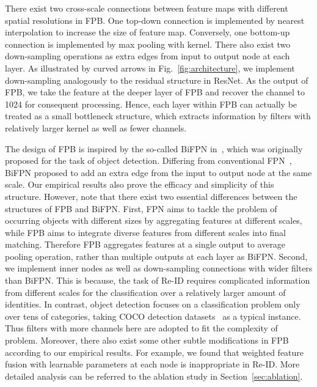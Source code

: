 \documentclass[journal]{IEEEtran}
\begin{document}
There exist two cross-scale connections between feature maps with different spatial resolutions in FPB.
One top-down connection is implemented by nearest interpolation to increase the size of feature map.
Conversely, one bottom-up connection is implemented by max pooling with  kernel.
There also exist two down-sampling operations as extra edges from input to output node at each layer.
As illustrated by curved arrows in Fig.~\ref{fig:architecture}, we implement down-sampling analogously to the residual structure in ResNet.
As the output of FPB, we take the feature at the deeper layer of FPB and recover the channel to 1024 for consequent processing.
Hence, each layer within FPB can actually be treated as a small bottleneck structure, which extracts information by filters with relatively larger kernel as well as fewer channels.

The design of FPB is inspired by the so-called BiFPN in~\cite{9156454}, which was originally proposed for the task of object detection.
Differing from conventional FPN~\cite{8099589,8579011}, BiFPN proposed to add an extra edge from the input to output node at the same scale.
Our empirical results also prove the efficacy and simplicity of this structure.
However, note that there exist two essential differences between the structures of FPB and BiFPN.
First, FPN aims to tackle the problem of occurring objects with different sizes by aggregating features at different scales, while FPB aims to integrate diverse features from different scales into final matching.
Therefore FPB aggregates features at a single output to average pooling operation, rather than multiple outputs at each layer as BiFPN.
Second, we implement inner nodes as well as down-sampling connections with wider filters than BiFPN.
This is because, the task of Re-ID requires complicated information from different scales for the classification over a relatively larger amount of identities.
In contrast, object detection focuses on a classification problem only over tens of categories, taking COCO detection datasets~\cite{978-3-319-10602-1_48} as a typical instance.
Thus filters with more channels here are adopted to fit the complexity of problem.
Moreover, there also exist some other subtle modifications in FPB according to our empirical results.
For example, we found that weighted feature fusion with learnable parameters at each node is inappropriate in Re-ID.
More detailed analysis can be referred to the ablation study in Section~\ref{sec:ablation}.
\end{document}
